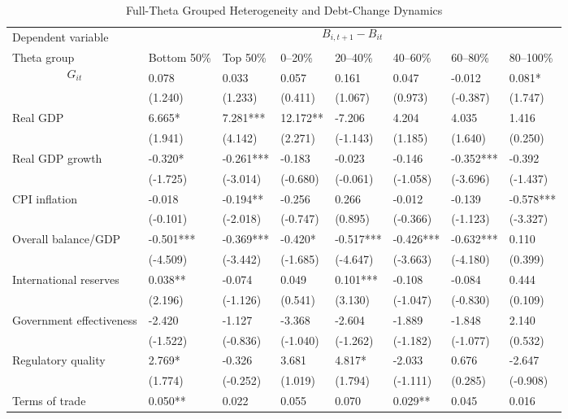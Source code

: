 \begin{table}[H]\centering
\begin{threeparttable}
\caption{Full-Theta Grouped Heterogeneity and Debt-Change Dynamics}
\label{tab:theta_group_heterogeneity_debt}
\scriptsize
\begin{tabularx}{\textwidth}{lYYYYYYY}
\toprule
Dependent variable &  \\
\cmidrule(lr){2-8}
Theta group & Bottom 50\% & Top 50\% & 0--20\% & 20--40\% & 40--60\% & 60--80\% & 80--100\% \\
\midrule
$$G_{it}$$ & 0.078 & 0.033 & 0.057 & 0.161 & 0.047 & -0.012 & 0.081* \\
  & (1.240) & (1.233) & (0.411) & (1.067) & (0.973) & (-0.387) & (1.747) \\
Real GDP & 6.665* & 7.281*** & 12.172** & -7.206 & 4.204 & 4.035 & 1.416 \\
  & (1.941) & (4.142) & (2.271) & (-1.143) & (1.185) & (1.640) & (0.250) \\
Real GDP growth & -0.320* & -0.261*** & -0.183 & -0.023 & -0.146 & -0.352*** & -0.392 \\
  & (-1.725) & (-3.014) & (-0.680) & (-0.061) & (-1.058) & (-3.696) & (-1.437) \\
CPI inflation & -0.018 & -0.194** & -0.256 & 0.266 & -0.012 & -0.139 & -0.578*** \\
  & (-0.101) & (-2.018) & (-0.747) & (0.895) & (-0.366) & (-1.123) & (-3.327) \\
Overall balance/GDP & -0.501*** & -0.369*** & -0.420* & -0.517*** & -0.426*** & -0.632*** & 0.110 \\
  & (-4.509) & (-3.442) & (-1.685) & (-4.647) & (-3.663) & (-4.180) & (0.399) \\
International reserves & 0.038** & -0.074 & 0.049 & 0.101*** & -0.108 & -0.084 & 0.444 \\
  & (2.196) & (-1.126) & (0.541) & (3.130) & (-1.047) & (-0.830) & (0.109) \\
Government effectiveness & -2.420 & -1.127 & -3.368 & -2.604 & -1.889 & -1.848 & 2.140 \\
  & (-1.522) & (-0.836) & (-1.040) & (-1.262) & (-1.182) & (-1.077) & (0.532) \\
Regulatory quality & 2.769* & -0.326 & 3.681 & 4.817* & -2.033 & 0.676 & -2.647 \\
  & (1.774) & (-0.252) & (1.019) & (1.794) & (-1.111) & (0.285) & (-0.908) \\
Terms of trade & 0.050** & 0.022 & 0.055 & 0.070 & 0.029** & 0.045 & 0.016 \\

\end{tabularx}
\end{threeparttable}
\end{table}
